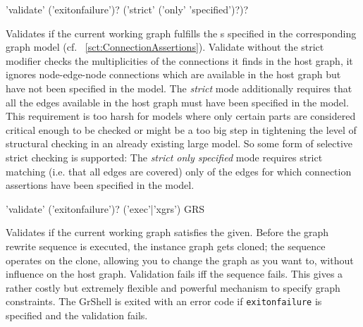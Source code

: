 \begin{rail}
  'validate' ('exitonfailure')? ('strict' ('only' 'specified')?)?
\end{rail}
Validates if the current working graph fulfills the s specified in the corresponding graph model (cf. ~\ref{sct:ConnectionAssertions}).
Validate without the strict modifier checks the multiplicities of the connections it finds in the host graph,
it ignores node-edge-node connections which are available in the host graph but have not been specified in the model.
The \emph{strict} mode additionally requires that all the edges available in the host graph must have been specified in the model.
This requirement is too harsh for models where only certain parts are considered critical enough to be checked
or might be a too big step in tightening the level of structural checking in an already existing large model.
So some form of selective strict checking is supported:
The \emph{strict only specified} mode requires strict matching (i.e. that all edges are covered) only of the edges for which connection assertions have been specified in the model.

\begin{rail}
  'validate' ('exitonfailure')? ('exec'|'xgrs') GRS
\end{rail}
Validates if the current working graph satisfies the  given.
Before the graph rewrite sequence is executed, the instance graph gets cloned;
the sequence operates on the clone, allowing you to change the graph as you want to, without influence on the host graph.
Validation fails iff the sequence fails.
This gives a rather costly but extremely flexible and powerful mechanism to specify graph constraints.
The GrShell is exited with an error code if \texttt{exitonfailure} is specified and the validation fails.

